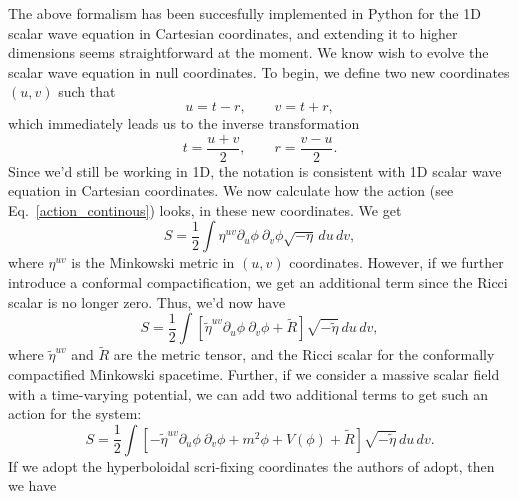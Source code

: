 \documentclass[nofootinbib,preprintnumbers,superscriptaddress,notitlepage]{revtex4-1}
\newcommand{\<}{\begin{equation}}
\newcommand{\?}{\end{equation}}
\begin{document}
The above formalism has been succesfully implemented in Python for the 1D
scalar wave equation in Cartesian coordinates, and extending it to higher
dimensions seems straightforward at the moment. We know wish to evolve the 
scalar wave equation in null coordinates. To begin, we define two new coordinates 
$(u,v)$ such that
\begin{equation}
u = t - r, \qquad v = t + r,
\end{equation}
which immediately leads us to the inverse transformation
\begin{equation}
t = \dfrac{u + v}{2}, \qquad r = \dfrac{v - u}{2}.
\end{equation}
Since we'd still be working in 1D, the notation is consistent with 1D scalar
wave equation in Cartesian coordinates. We now calculate how the
action (see Eq.~\ref{action_continous}) looks, in these new coordinates. We get
\begin{equation}
S = \dfrac{1}{2} \int \eta^{uv}\partial_u\phi ~\partial_v\phi  \sqrt{-\eta}\,du\,dv,
\end{equation}
where $\eta^{uv}$ is the Minkowski metric in $(u,v)$ coordinates. However, if
we further introduce a conformal compactification, we get an additional term 
since the Ricci scalar is no longer zero. Thus, we'd now have 
\begin{equation}
S = \dfrac{1}{2}\int \left[ \tilde{\eta}^{uv}\partial_u\phi ~\partial_v\phi + \tilde{R} \right] \sqrt{-\tilde{\eta}}\,du\,dv,
\end{equation}
where $\tilde{\eta}^{uv}$ and $\tilde{R}$ are the metric tensor, and the Ricci
scalar for the conformally compactified Minkowski spacetime. Further, if we
consider a massive scalar field with a time-varying potential, we can add two
additional terms to get such an action for the system:
\begin{equation}
S = \dfrac{1}{2}\int \left[ -\tilde{\eta}^{uv}\partial_u\phi ~\partial_v\phi + m^2\phi + V(\phi) + \tilde{R} \right] \sqrt{-\tilde{\eta}}\,du\,dv.
\end{equation}
If we adopt the hyperboloidal scri-fixing coordinates the authors of \cite{Zenginolu} adopt, then we have

\end{document}
